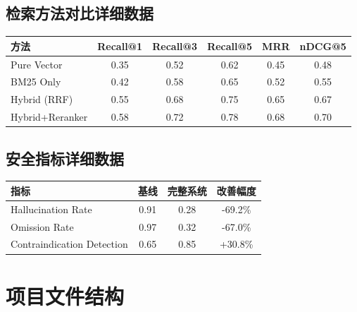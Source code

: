 \documentclass[12pt,a4paper]{article}
\begin{document}
\subsection{检索方法对比详细数据}

\begin{table}[H]
    \centering
    \begin{tabular}{lccccc}
        \toprule
        \textbf{方法} & \textbf{Recall@1} & \textbf{Recall@3} & \textbf{Recall@5} & \textbf{MRR} & \textbf{nDCG@5} \\
        \midrule
        Pure Vector & 0.35 & 0.52 & 0.62 & 0.45 & 0.48 \\
        BM25 Only & 0.42 & 0.58 & 0.65 & 0.52 & 0.55 \\
        Hybrid (RRF) & 0.55 & 0.68 & 0.75 & 0.65 & 0.67 \\
        Hybrid+Reranker & 0.58 & 0.72 & 0.78 & 0.68 & 0.70 \\
        \bottomrule
    \end{tabular}
\end{table}

\subsection{安全指标详细数据}

\begin{table}[H]
    \centering
    \begin{tabular}{lccc}
        \toprule
        \textbf{指标} & \textbf{基线} & \textbf{完整系统} & \textbf{改善幅度} \\
        \midrule
        Hallucination Rate & 0.91 & 0.28 & -69.2\% \\
        Omission Rate & 0.97 & 0.32 & -67.0\% \\
        Contraindication Detection & 0.65 & 0.85 & +30.8\% \\
        \bottomrule
    \end{tabular}
\end{table}

\section{项目文件结构}
\label{app:structure}
\end{document}
